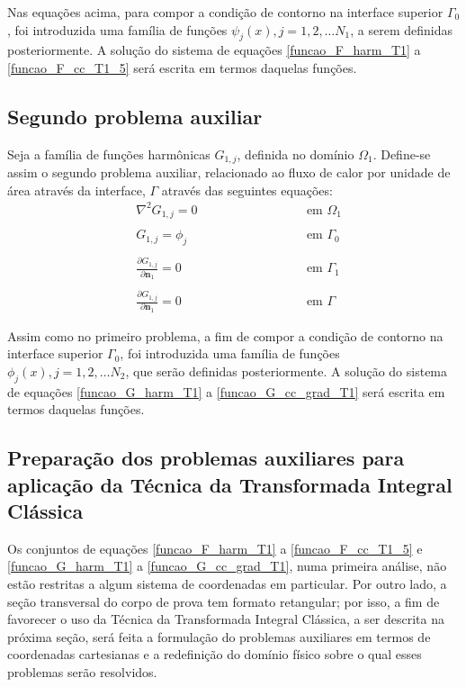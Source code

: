 Nas equações acima, para compor a condição de contorno na interface superior $\Gamma_0$, foi introduzida uma família de funções $\psi_j(x), j=1,2,\ldots N_1$, a serem definidas posteriormente. A solução do sistema de equações \eqref{funcao_F_harm_T1} a \eqref{funcao_F_cc_T1_5} será escrita em termos daquelas funções. 

\subsection{Segundo problema auxiliar}\label{secao_do_segundo}
Seja a família de funções harmônicas $G_{1, j}$, definida no domínio $\Omega_1$. Define-se assim o segundo
problema auxiliar, relacionado ao fluxo de calor por unidade de área através da interface, $\Gamma$ através das seguintes equações:
\begin{subequations}
	\begin{alignat}{2}
	& \nabla^2 G_{1,j} = 0 \quad\quad\quad\quad\quad && \text{ em } \Omega_1 \label{funcao_G_harm_T1} \\ \nonumber \\
	& G_{1,j} = \phi_j && \text{ em } \Gamma_0  \label{funcao_G_cc_T1_2} \\ \nonumber \\
	& \frac{\partial G_{1,j}}{\partial \mathbf{n}_1} = 0 && \text{ em }  \Gamma_1 \label{funcao_G_cc_T1_1} \\ \nonumber \\
	& \frac{\partial G_{1,j}}{\partial\mathbf{n}_1} = 0 \quad\quad\quad\quad\quad\quad\quad\quad && \text{ em }  \Gamma \label{funcao_G_cc_grad_T1}
	\end{alignat}
\end{subequations}

Assim como no primeiro problema, a fim de compor a condição de contorno na interface superior $\Gamma_0$, foi introduzida uma família de funções $\phi_j(x), j=1,2,\ldots N_2$, que serão definidas posteriormente. A solução do sistema de equações \eqref{funcao_G_harm_T1} a \eqref{funcao_G_cc_grad_T1} será escrita em termos daquelas funções. 

\subsection{Preparação dos problemas auxiliares para aplicação da Técnica da Transformada Integral Clássica}
Os conjuntos de equações \eqref{funcao_F_harm_T1} a \eqref{funcao_F_cc_T1_5} e \eqref{funcao_G_harm_T1} a \eqref{funcao_G_cc_grad_T1}, numa primeira análise,
não estão restritas a algum sistema de coordenadas em particular. Por outro lado, a seção transversal do corpo de prova tem formato retangular; por isso,
a fim de favorecer o uso da Técnica da Transformada Integral Clássica, a ser descrita na próxima seção,
será feita a formulação do problemas auxiliares em termos de coordenadas cartesianas e a redefinição do domínio físico sobre o qual esses problemas
serão resolvidos.

